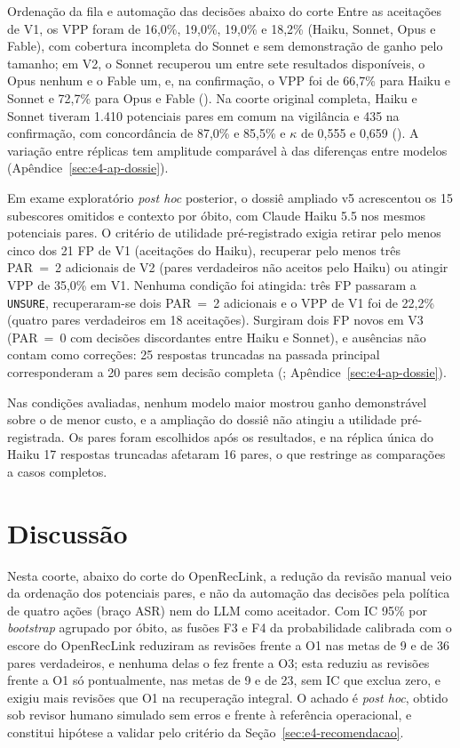 \begin{chapter}{Ordenação da fila e automação das decisões abaixo do corte}
Entre as aceitações de V1, os VPP foram de 16,0\%, 19,0\%, 19,0\% e 18,2\% (Haiku, Sonnet, Opus e Fable), com cobertura incompleta do Sonnet e sem demonstração de ganho pelo tamanho; em V2, o Sonnet recuperou um entre sete resultados disponíveis, o Opus nenhum e o Fable um, e, na confirmação, o VPP foi de 66,7\% para Haiku e Sonnet e 72,7\% para Opus e Fable (). Na coorte original completa, Haiku e Sonnet tiveram 1.410 potenciais pares em comum na vigilância e 435 na confirmação, com concordância de 87,0\% e 85,5\% e $\kappa$ de 0,555 e 0,659 (). A variação entre réplicas tem amplitude comparável à das diferenças entre modelos (Apêndice~\ref{sec:e4-ap-dossie}).



Em exame exploratório \textit{post hoc} posterior, o dossiê ampliado v5 acrescentou os 15 subescores omitidos e contexto por óbito, com Claude Haiku 5.5 nos mesmos potenciais pares. O critério de utilidade pré-registrado exigia retirar pelo menos cinco dos 21 FP de V1 (aceitações do Haiku), recuperar pelo menos três PAR~=~2 adicionais de V2 (pares verdadeiros não aceitos pelo Haiku) ou atingir VPP de 35,0\% em V1. Nenhuma condição foi atingida: três FP passaram a \texttt{UNSURE}, recuperaram-se dois PAR~=~2 adicionais e o VPP de V1 foi de 22,2\% (quatro pares verdadeiros em 18 aceitações). Surgiram dois FP novos em V3 (PAR~=~0 com decisões discordantes entre Haiku e Sonnet), e ausências não contam como correções: 25 respostas truncadas na passada principal corresponderam a 20 pares sem decisão completa (; Apêndice~\ref{sec:e4-ap-dossie}).

Nas condições avaliadas, nenhum modelo maior mostrou ganho demonstrável sobre o de menor custo, e a ampliação do dossiê não atingiu a utilidade pré-registrada. Os pares foram escolhidos após os resultados, e na réplica única do Haiku 17 respostas truncadas afetaram 16 pares, o que restringe as comparações a casos completos.

\section{Discussão}\label{sec:e4-discussao}

Nesta coorte, abaixo do corte do OpenRecLink, a redução da revisão manual veio da ordenação dos potenciais pares, e não da automação das decisões pela política de quatro ações (braço ASR) nem do LLM como aceitador. Com IC 95\% por \textit{bootstrap} agrupado por óbito, as fusões F3 e F4 da probabilidade calibrada com o escore do OpenRecLink reduziram as revisões frente a O1 nas metas de 9 e de 36 pares verdadeiros, e nenhuma delas o fez frente a O3; esta reduziu as revisões frente a O1 só pontualmente, nas metas de 9 e de 23, sem IC que exclua zero, e exigiu mais revisões que O1 na recuperação integral. O achado é \textit{post hoc}, obtido sob revisor humano simulado sem erros e frente à referência operacional, e constitui hipótese a validar pelo critério da Seção~\ref{sec:e4-recomendacao}.


\end{chapter}

